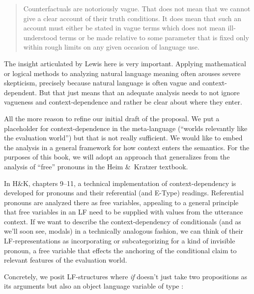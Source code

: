 \begin{quote} Counterfactuals are notoriously vague. That does not mean that we
  cannot give a clear account of their truth conditions. It does mean that such
  an account must either be stated in vague terms \dash which does not mean
  ill-understood terms \dash or be made relative to some parameter that is fixed
  only within rough limits on any given occasion of language use.
\end{quote}
%
\clearpage
{}%
The insight articulated by Lewis here is very important. Applying mathematical
or logical methods to analyzing natural language meaning often arouses severe
skepticism, precisely because natural language is often vague and
context-dependent. But that just means that an adequate analysis needs to not
ignore vagueness and context-dependence and rather be clear about where they
enter.

All the more reason to refine our initial draft of the proposal. We put a
placeholder for context-dependence in the meta-language (``worlds relevantly
like the evaluation world'') but that is not really sufficient. We would like to
embed the analysis in a general framework for how context enters the semantics.
For the purposes of this book, we will adopt an approach that generalizes from
the analysis of ``free'' pronouns in the Heim \&\ Kratzer textbook.

In H\&K, chapters 9--11, a technical implementation of context-dependency is
developed for pronouns and their referential (and E-Type) readings. Referential
pronouns are analyzed there as free variables, appealing to a general principle
that free variables in an LF need to be supplied with values from the utterance
context. If we want to describe the context-dependency of conditionals (and as
we'll soon see, modals) in a technically analogous fashion, we can think of
their LF-representations as incorporating or subcategorizing for a kind of
invisible pronoun, a free variable that effects the anchoring of the conditional
claim to relevant features of the evaluation world.

%
Concretely, we posit LF-structures where \emph{if} doesn't just take two
propositions as its arguments but also an object language variable of type
:


